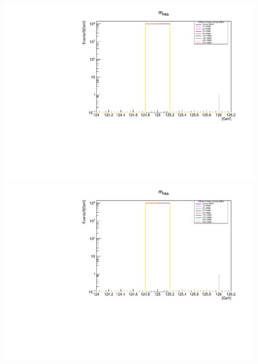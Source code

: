 \documentclass[a4wide,10pt]{article}
\begin{document}
\includegraphics[scale=0.50,page=13]{../Pdfs/Hbb_Mass_VaryingWidths.pdf}
\includegraphics[scale=0.50,page=14]{../Pdfs/Hbb_Mass_VaryingWidths.pdf}
\end{document}
